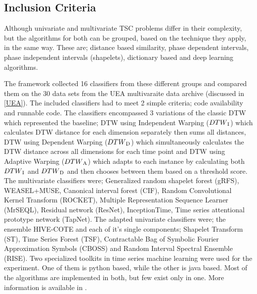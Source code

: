 \subsection{Inclusion Criteria}
\label{subsectionMultiBakeoffInclusion}
Although univariate and multivariate TSC problems differ in their complexity, but the algorithms for both can be grouped, based on the technique they apply, in the same way.
These are; distance based similarity, phase dependent intervals, phase independent intervals (shapelets), dictionary based and deep learning algorithms.

The framework collected 16 classifiers from these different groups and compared them on the 30 data sets from the UEA multivaraite data archive (discussed in \ref{UEA}).
The included classifiers had to meet 2 simple criteria; code availability and runnable code.
The classifiers encompassed 3 variations of the classic DTW which represented the baseline; DTW using Independent Warping ($DTW\textsubscript{I}$) which calculates DTW distance for each dimension separately then
sums all distances, DTW using Dependent Warping ($DTW\textsubscript{D}$) which simultaneously calculates the DTW distance across all dimensions for each time point and DTW using Adaptive Warping
($DTW\textsubscript{A}$) which adapts to each instance by calculating both $DTW\textsubscript{I}$ and $DTW\textsubscript{D}$ and then chooses between them based on a threshold score.
The multivariate classifiers were; Generalized random shapelet forest (gRFS), WEASEL+MUSE, Canonical interval forest (CIF), Random Convolutional Kernel Transform (ROCKET),
Multiple Representation Sequence Learner (MrSEQL), Residual network (ResNet), InceptionTime, Time series attentional prototype network (TapNet).
The adapted univariate classifiers were; the ensemble HIVE-COTE and each of it's single components; Shapelet Transform (ST), Time Series Forest (TSF), Contractable Bag of Symbolic Fourier Approximation Symbols (CBOSS)
and Random Interval Spectral Ensemble (RISE).
Two specialized toolkits in time series machine learning were used for the experiment. One of them is python based, while the other is java based.
Most of the algorithms are implemented in both, but few exist only in one. More information is available in \cite{ruiz2020great}.

